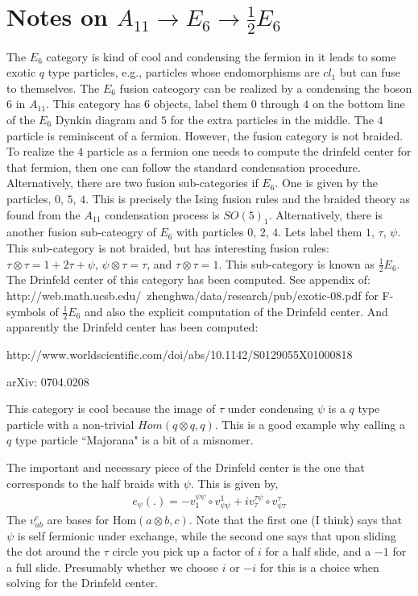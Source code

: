 \documentclass[12pt,a4paper]{article}
\begin{document}
{{\section{Notes on $A_{11} \rightarrow E_6 \rightarrow \frac{1}{2} E_6$}
The $E_6$ category is kind of cool and condensing the fermion in it leads to some exotic $q$ type particles, e.g., particles whose endomorphisms are $cl_1$ but can fuse to themselves. 
The $E_6$ fusion cateogory can be realized by a condensing the boson $6$ in $A_{11}$. 
This category has $6$ objects, label them $0$ through $4$ on the bottom line of the $E_6$ Dynkin diagram and $5$ for the extra particles in the middle. 
The $4$ particle is reminiscent of a fermion. 
However, the fusion category is not braided. 
To realize the $4$ particle as a fermion one needs to compute the drinfeld center for that fermion, then one can follow the standard condensation procedure.
Alternatively, there are two fusion sub-categories if $E_6$. 
One is given by the particles, $0$, $5$, $4$. 
This is precisely the Ising fusion rules and the braided theory as found from the $A_{11}$ condensation process is $SO(5)_1$.
Alternatively, there is another fusion sub-cateogry of $E_6$ with particles $0$, $2$, $4$. Lets label them $1$, $\tau$, $\psi$. 
This sub-category is not braided, but has interesting fusion rules: $\tau \otimes \tau = 1+ 2\tau + \psi$, $\psi \otimes \tau = \tau$, and $\tau \otimes \tau = 1$. 
This sub-category is known as $\frac{1}{2}E_6$. 
The Drinfeld center of this category has been computed.
See appendix of: http://web.math.ucsb.edu/~zhenghwa/data/research/pub/exotic-08.pdf 
for F-symbols of $\frac{1}{2}E_6$ and also the explicit computation of the Drinfeld center. 
And apparently the Drinfeld center has been computed: 


http://www.worldscientific.com/doi/abs/10.1142/S0129055X01000818

arXiv: 0704.0208

This category is cool because the image of $\tau$ under condensing $\psi$ is a $q$ type particle with a non-trivial $Hom(q\otimes q, q)$. 
This is a good example why calling a $q$ type particle ``Majorana" is a bit of a misnomer. 

The important and necessary piece of the Drinfeld center is the one that corresponds to the half braids with $\psi$. 
This is given by,
\begin{align}
e_{\psi}(. ) = - v^{\psi \psi}_{1} \circ v^{1}_{\psi \psi} + i v^{\tau \psi}_\tau \circ v^{\tau}_{\psi \tau}
\end{align}
The $v^{c}_{ab}$ are bases for $\text{Hom}(a \otimes b, c)$. 
Note that the first one (I think) says that $\psi$ is self fermionic under exchange, while the second one says that upon sliding the dot around the $\tau$ circle you pick up a factor of $i$ for a half slide, and a $-1$ for a full slide. Presumably whether we choose $i$ or $-i$ for this is a choice when solving for the Drinfeld center.




}}
\end{document}
